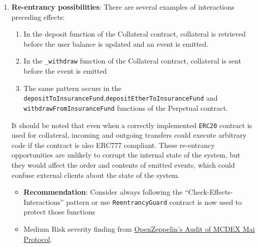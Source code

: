\begin{enumerate}
\item\textbf{Re-entrancy possibilities}: There are several examples of interactions preceding effects:
    \begin{enumerate}
    \item In the deposit function of the Collateral contract, collateral is retrieved before the user balance is updated and an event is emitted.
    \item In the \verb|_withdraw| function of the Collateral contract, collateral is sent before the event is emitted
    \item The same pattern occurs in the \verb|depositToInsuranceFund|,\linebreak\verb|depositEtherToInsuranceFund| and \verb|withdrawFromInsuranceFund| functions of the Perpetual contract.
    \end{enumerate}
It should be noted that even when a correctly implemented \verb|ERC20| contract is used for collateral, incoming and outgoing transfers could execute arbitrary code if the contract is also ERC777 compliant. These re-entrancy opportunities are unlikely to corrupt the internal state of the system, but they would affect the order and contents of emitted events, which could confuse external clients about the state of the system.
	\begin{itemize}
	\item\textbf{Recommendation}: Consider always following the “Check-Effects-Interactions” pattern or use \verb|ReentrancyGuard| contract is now used to protect those functions
	\item Medium Risk severity finding from \href{https://blog.openzeppelin.com/mcdex-mai-protocol-audit/}{OpenZeppelin’s Audit of MCDEX Mai Protocol}.
	\end{itemize}


\end{enumerate}
